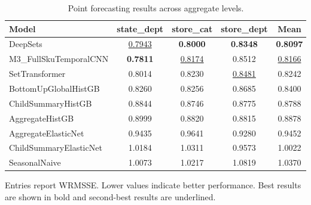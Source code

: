 \begin{table}[H]
\centering
\caption{Point forecasting results across aggregate levels.}
\label{tab:main_point}
\begin{threeparttable}
\begin{tabular}{lcccc}
\toprule
Model & state\_dept & store\_cat & store\_dept & Mean \\
\midrule
DeepSets & \underline{0.7943} & \textbf{0.8000} & \textbf{0.8348} & \textbf{0.8097} \\
M3\_FullSkuTemporalCNN & \textbf{0.7811} & \underline{0.8174} & 0.8512 & \underline{0.8166} \\
SetTransformer & 0.8014 & 0.8230 & \underline{0.8481} & 0.8242 \\
BottomUpGlobalHistGB & 0.8260 & 0.8256 & 0.8685 & 0.8400 \\
ChildSummaryHistGB & 0.8844 & 0.8746 & 0.8775 & 0.8788 \\
AggregateHistGB & 0.8999 & 0.8820 & 0.8815 & 0.8878 \\
AggregateElasticNet & 0.9435 & 0.9641 & 0.9280 & 0.9452 \\
ChildSummaryElasticNet & 1.0184 & 1.0311 & 0.9573 & 1.0022 \\
SeasonalNaive & 1.0073 & 1.0217 & 1.0819 & 1.0370 \\
\bottomrule
\end{tabular}
\begin{tablenotes}
\footnotesize \item Entries report WRMSSE. Lower values indicate better performance. Best results are shown in bold and second-best results are underlined.
\end{tablenotes}
\end{threeparttable}
\end{table}
